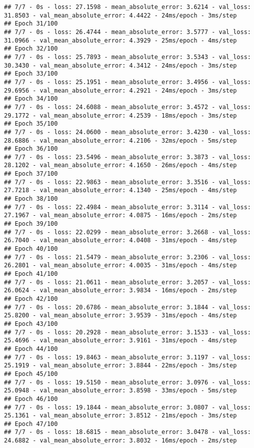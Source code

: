 \documentclass[
]{article}
\begin{document}
\begin{verbatim}
## 7/7 - 0s - loss: 27.1598 - mean_absolute_error: 3.6214 - val_loss: 31.8503 - val_mean_absolute_error: 4.4422 - 24ms/epoch - 3ms/step
## Epoch 31/100
## 7/7 - 0s - loss: 26.4744 - mean_absolute_error: 3.5777 - val_loss: 31.0966 - val_mean_absolute_error: 4.3929 - 25ms/epoch - 4ms/step
## Epoch 32/100
## 7/7 - 0s - loss: 25.7893 - mean_absolute_error: 3.5343 - val_loss: 30.3430 - val_mean_absolute_error: 4.3412 - 24ms/epoch - 3ms/step
## Epoch 33/100
## 7/7 - 0s - loss: 25.1951 - mean_absolute_error: 3.4956 - val_loss: 29.6956 - val_mean_absolute_error: 4.2921 - 24ms/epoch - 3ms/step
## Epoch 34/100
## 7/7 - 0s - loss: 24.6088 - mean_absolute_error: 3.4572 - val_loss: 29.1772 - val_mean_absolute_error: 4.2539 - 18ms/epoch - 3ms/step
## Epoch 35/100
## 7/7 - 0s - loss: 24.0600 - mean_absolute_error: 3.4230 - val_loss: 28.6886 - val_mean_absolute_error: 4.2106 - 32ms/epoch - 5ms/step
## Epoch 36/100
## 7/7 - 0s - loss: 23.5496 - mean_absolute_error: 3.3873 - val_loss: 28.1202 - val_mean_absolute_error: 4.1650 - 26ms/epoch - 4ms/step
## Epoch 37/100
## 7/7 - 0s - loss: 22.9863 - mean_absolute_error: 3.3516 - val_loss: 27.7218 - val_mean_absolute_error: 4.1340 - 25ms/epoch - 4ms/step
## Epoch 38/100
## 7/7 - 0s - loss: 22.4984 - mean_absolute_error: 3.3114 - val_loss: 27.1967 - val_mean_absolute_error: 4.0875 - 16ms/epoch - 2ms/step
## Epoch 39/100
## 7/7 - 0s - loss: 22.0299 - mean_absolute_error: 3.2668 - val_loss: 26.7040 - val_mean_absolute_error: 4.0408 - 31ms/epoch - 4ms/step
## Epoch 40/100
## 7/7 - 0s - loss: 21.5479 - mean_absolute_error: 3.2306 - val_loss: 26.2801 - val_mean_absolute_error: 4.0035 - 31ms/epoch - 4ms/step
## Epoch 41/100
## 7/7 - 0s - loss: 21.0611 - mean_absolute_error: 3.2057 - val_loss: 26.0624 - val_mean_absolute_error: 3.9834 - 16ms/epoch - 2ms/step
## Epoch 42/100
## 7/7 - 0s - loss: 20.6786 - mean_absolute_error: 3.1844 - val_loss: 25.8200 - val_mean_absolute_error: 3.9539 - 31ms/epoch - 4ms/step
## Epoch 43/100
## 7/7 - 0s - loss: 20.2928 - mean_absolute_error: 3.1533 - val_loss: 25.4696 - val_mean_absolute_error: 3.9161 - 31ms/epoch - 4ms/step
## Epoch 44/100
## 7/7 - 0s - loss: 19.8463 - mean_absolute_error: 3.1197 - val_loss: 25.1919 - val_mean_absolute_error: 3.8844 - 22ms/epoch - 3ms/step
## Epoch 45/100
## 7/7 - 0s - loss: 19.5150 - mean_absolute_error: 3.0976 - val_loss: 25.0948 - val_mean_absolute_error: 3.8598 - 33ms/epoch - 5ms/step
## Epoch 46/100
## 7/7 - 0s - loss: 19.1844 - mean_absolute_error: 3.0807 - val_loss: 25.1361 - val_mean_absolute_error: 3.8512 - 21ms/epoch - 3ms/step
## Epoch 47/100
## 7/7 - 0s - loss: 18.6815 - mean_absolute_error: 3.0478 - val_loss: 24.6882 - val_mean_absolute_error: 3.8032 - 16ms/epoch - 2ms/step

\end{verbatim}
\end{document}
